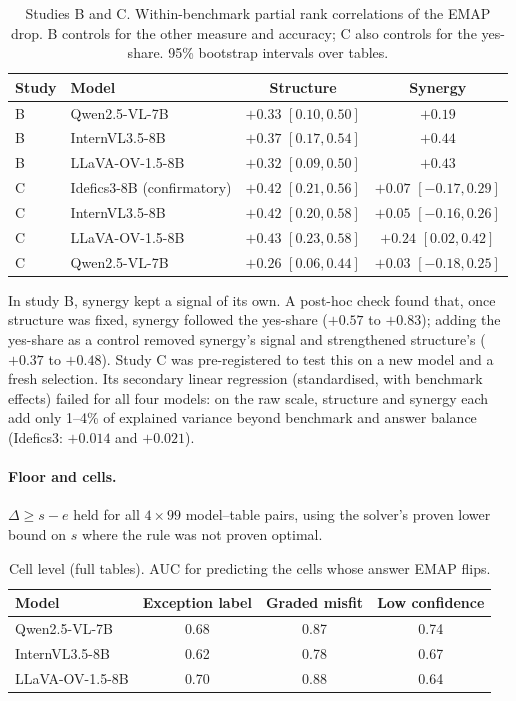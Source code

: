\begin{table}[h]
\centering\small\setlength{\tabcolsep}{3pt}
\caption{Studies B and C. Within-benchmark partial rank correlations of the EMAP drop. B
controls for the other measure and accuracy; C also controls for the yes-share. 95\%
bootstrap intervals over tables.}
\begin{tabular}{llcc}
\toprule
Study & Model & Structure & Synergy \\
\midrule
B & Qwen2.5-VL-7B   & $+0.33$ $[0.10, 0.50]$ & $+0.19$ \\
B & InternVL3.5-8B  & $+0.37$ $[0.17, 0.54]$ & $+0.44$ \\
B & LLaVA-OV-1.5-8B & $+0.32$ $[0.09, 0.50]$ & $+0.43$ \\
\midrule
C & Idefics3-8B (confirmatory) & $+0.42$ $[0.21, 0.56]$ & $+0.07$ $[-0.17, 0.29]$ \\
C & InternVL3.5-8B  & $+0.42$ $[0.20, 0.58]$ & $+0.05$ $[-0.16, 0.26]$ \\
C & LLaVA-OV-1.5-8B & $+0.43$ $[0.23, 0.58]$ & $+0.24$ $[0.02, 0.42]$ \\
C & Qwen2.5-VL-7B   & $+0.26$ $[0.06, 0.44]$ & $+0.03$ $[-0.18, 0.25]$ \\
\bottomrule
\end{tabular}
\end{table}

\noindent
In study B, synergy kept a signal of its own. A post-hoc check found that, once structure was
fixed, synergy followed the yes-share ($+0.57$ to $+0.83$); adding the yes-share as a control
removed synergy's signal and strengthened structure's ($+0.37$ to $+0.48$). Study C was
pre-registered to test this on a new model and a fresh selection. Its secondary linear
regression (standardised, with benchmark effects) failed for all four models: on the raw
scale, structure and synergy each add only 1--4\% of explained variance beyond benchmark and
answer balance (Idefics3: $+0.014$ and $+0.021$).

\paragraph{Floor and cells.}
$\Delta\ge s-e$ held for all $4\times99$ model--table pairs, using the solver's proven lower
bound on $s$ where the rule was not proven optimal.

\begin{table}[h]
\centering\small
\caption{Cell level (full tables). AUC for predicting the cells whose answer EMAP flips.}
\begin{tabular}{lccc}
\toprule
Model & Exception label & Graded misfit & Low confidence \\
\midrule
Qwen2.5-VL-7B   & 0.68 & 0.87 & 0.74 \\
InternVL3.5-8B  & 0.62 & 0.78 & 0.67 \\
LLaVA-OV-1.5-8B & 0.70 & 0.88 & 0.64 \\
\bottomrule
\end{tabular}
\end{table}


